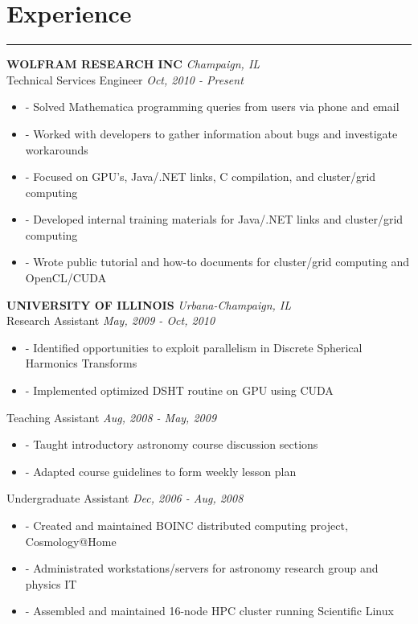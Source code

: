 \documentclass[a4paper,11pt]{article}
\newenvironment{pitemize}{
\begin{itemize}
\setlength{\itemsep}{.01in}
\setlength{\parskip}{.01in}
}
{\end{itemize}}
\begin{document}
\section*{\huge{Experience}}
\hrule
\vspace{0.1in}
\textbf{WOLFRAM RESEARCH INC} \hfill \textit{Champaign, IL} \\
Technical Services Engineer \hfill \textit{Oct, 2010 - Present}
\begin{pitemize}
\item[-]Solved Mathematica programming queries from users via phone and email
\item[-]Worked with developers to gather information about bugs and investigate workarounds
\item[-]Focused on GPU's, Java/.NET links, C compilation, and cluster/grid computing
\item[-]Developed internal training materials for Java/.NET links and cluster/grid computing
\item[-]Wrote public tutorial and how-to documents for cluster/grid computing and OpenCL/CUDA
\end{pitemize}
\vspace{0.2in}
\textbf{UNIVERSITY OF ILLINOIS} \hfill \textit{Urbana-Champaign, IL} \\
Research Assistant \hfill \textit{May, 2009 - Oct, 2010}
\begin{pitemize}
\item[-]Identified opportunities to exploit parallelism in Discrete Spherical Harmonics Transforms
\item[-]Implemented optimized DSHT routine on GPU using CUDA
\end{pitemize}
Teaching Assistant \hfill \textit{Aug, 2008 - May, 2009}
\begin{pitemize}
\item[-]Taught introductory astronomy course discussion sections
\item[-]Adapted course guidelines to form weekly lesson plan
\end{pitemize}
Undergraduate Assistant \hfill \textit{Dec, 2006 - Aug, 2008}
\begin{pitemize}
\item[-]Created and maintained BOINC distributed computing project, Cosmology@Home
\item[-]Administrated workstations/servers for astronomy research group and physics IT
\item[-]Assembled and maintained 16-node HPC cluster running Scientific Linux
\end{pitemize}
\end{document}
